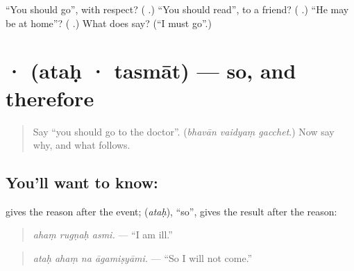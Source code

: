 \begin{tcolorbox}[breakable,colback=teal!4,colframe=teal!35!black,title={Before you move on}]
\textquotedblleft{}You should go\textquotedblright{}, with respect? (\textbf{ }.) \textquotedblleft{}You should read\textquotedblright{}, to a friend? (\textbf{ }.) \textquotedblleft{}He may be at home\textquotedblright{}? (\textbf{  }.) What does \textbf{ } say? (\textquotedblleft{}I must go\textquotedblright{}.)
\end{tcolorbox}
\section[\texorpdfstring{\sk{अतः} · \sk{तस्मात्} (ataḥ · tasmāt)}{अतः · तस्मात् (ataḥ · tasmāt)}]{ ·  (ataḥ · tasmāt) — so, and therefore}

\label{lesson:SA-C279-atah-tasmat}



\begin{quote}
Say \textquotedblleft{}you should go to the doctor\textquotedblright{}. (\emph{bhavān vaidyaṃ gacchet}.) Now say why, and what follows.
\end{quote}

\subsection*{You'll want to know: }
\textbf{} gives the reason after the event; \textbf{} (\emph{ataḥ}), \textquotedblleft{}so\textquotedblright{}, gives the result after the reason:

\begin{quote}
\textbf{  }
\end{quote}

\begin{quote}
\emph{ahaṃ rugṇaḥ asmi.} — \textquotedblleft{}I am ill.\textquotedblright{}
\end{quote}

\begin{quote}
\textbf{   }
\end{quote}

\begin{quote}
\emph{ataḥ ahaṃ na āgamiṣyāmi.} — \textquotedblleft{}So I will not come.\textquotedblright{}
\end{quote}

